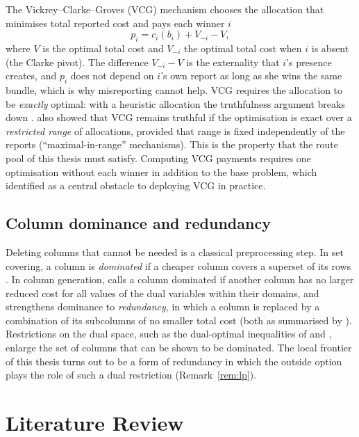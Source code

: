 The Vickrey--Clarke--Groves (VCG) mechanism chooses the allocation that
minimises total reported cost and pays each winner $i$
\[
p_i = c_i(b_i) + V_{-i} - V,
\]
where $V$ is the optimal total cost and $V_{-i}$ the optimal total cost when
$i$ is absent (the Clarke pivot). The difference $V_{-i}-V$ is the
externality that $i$'s presence creates, and $p_i$ does not depend on $i$'s
own report as long as she wins the same bundle, which is why misreporting
cannot help. VCG requires the allocation to be \emph{exactly} optimal: with a
heuristic allocation the truthfulness argument breaks down
\citep{nisan2007computationally}. \citet{nisan2007computationally} also
showed that VCG remains truthful if the optimisation is exact over a
\emph{restricted range} of allocations, provided that range is fixed
independently of the reports (``maximal-in-range'' mechanisms). This is the
property that the route pool of this thesis must satisfy. Computing VCG
payments requires one optimisation without each winner in addition to the
base problem, which \citet{nisan2000computationally} identified as a central
obstacle to deploying VCG in practice.

\subsection{Column dominance and redundancy}

Deleting columns that cannot be needed is a classical preprocessing step. In
set covering, a column is \emph{dominated} if a cheaper column covers a
superset of its rows \citep{beasley1987algorithm}. In column generation,
\citet{vanderbeck1994thesis} calls a column dominated if another column has
no larger reduced cost for all values of the dual variables within their
domains, and \citet{sol1994column} strengthens dominance to
\emph{redundancy}, in which a column is replaced by a combination of its
subcolumns of no smaller total cost (both as summarised by
\citealp{lubbecke2005selected}). Restrictions on the dual space, such as the
dual-optimal inequalities of \citet{valerio2005extra} and
\citet{benamor2006dual}, enlarge the set of columns that can be shown to be
dominated. The local frontier of this thesis turns out to be a form of
redundancy in which the outside option plays the role of such a dual
restriction (Remark~\ref{rem:lp}).

\section{Literature Review}
\label{sec:litreview}

